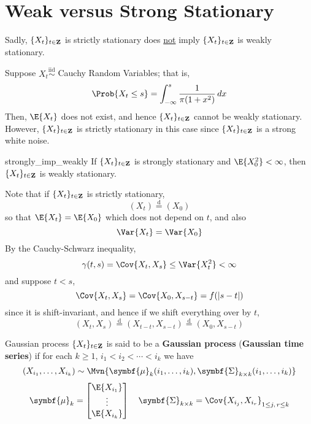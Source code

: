 \section{Weak versus Strong Stationary}
Sadly, $ \{X_t\}_{t\in\mathbf{Z}} $ is strictly stationary does \underline{not} imply
$ \{X_t\}_{t\in\mathbf{Z}} $ is weakly stationary.
\begin{Example}{}{}
    Suppose $ X_t\stackrel{\text{iid}}{\sim} $ Cauchy Random Variables;
    that is,
    \[ \Prob{X_t\le s}=\int_{-\infty}^{s} \frac{1}{\pi(1+x^2)}\, d{x}  \]
    Then, $ \E{X_t} $ does not exist, and hence $ \{X_t\}_{t\in\mathbf{Z}} $ cannot
    be weakly stationary. However, $ \{X_t\}_{t\in\mathbf{Z}} $ is strictly
    stationary in this case since $ \{X_t\}_{t\in\mathbf{Z}} $ is a strong
    white noise.
\end{Example}
\begin{Theorem}{}{strongly_imp_weakly}
    If $ \{X_t\}_{t\in\mathbf{Z}} $ is strongly stationary and $ \E{X_0^2}<\infty $,
    then $ \{X_t\}_{t\in\mathbf{Z}} $ is weakly stationary.
\end{Theorem}
\begin{Proof}{}{}
    Note that if $ \{X_t\}_{t\in\mathbf{Z}} $ is strictly stationary,
    \[ (X_t)\stackrel{\text{d}}{=}(X_0) \]
    so that $ \E{X_t}=\E{X_0} $ which does not depend on $ t $, and also
    \[ \Var{X_t}=\Var{X_0} \]
    By the Cauchy-Schwarz inequality,
    \[ \gamma(t,s)=\Cov{X_t,X_s}\le \Var{X_t^2}<\infty \]
    and suppose $ t<s $,
    \[ \Cov{X_t,X_s}=\Cov{X_0,X_{s-t}}=f(\abs{s-t}) \]
    since it is shift-invariant, and hence if we shift everything over by $ t $,
    \[ (X_t,X_s)\stackrel{\text{d}}{=}(X_{t-t},X_{s-t})\stackrel{\text{d}}{=}(X_0,X_{s-t}) \]
\end{Proof}
\begin{Definition}{Gaussian process}{}
    $ \{X_t\}_{t\in\mathbf{Z}} $ is said to be a
    \textbf{Gaussian process} (\textbf{Gaussian time series}) if
    for each $ k\ge 1 $, $ i_1<i_2<\cdots<i_k $ we have
    \[ (X_{i_1},\ldots,X_{i_k})\sim
        \Mvn{\symbf{\mu}_k(i_1,\ldots,i_k),\symbf{\Sigma}_{k\times k}(i_1,\ldots,i_k)} \]
    \[ \symbf{\mu}_k=\begin{bmatrix}
            \E{X_{i_1}} \\
            \vdots      \\
            \E{X_{i_k}}
        \end{bmatrix}\quad
        \symbf{\Sigma}_{k\times k}=
        \Cov{X_{i_j},X_{i_r}}_{1\le j,\, r\le k} \]
\end{Definition}
